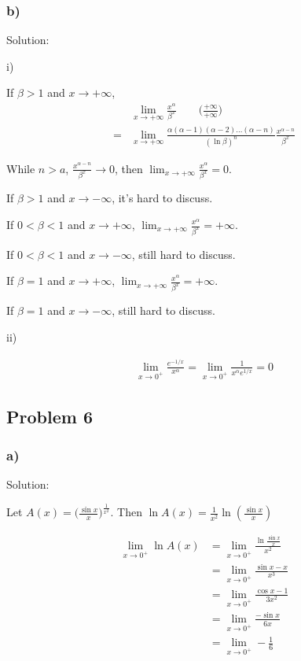 \documentclass[letterpaper, 11pt]{article}
\newcommand{\1}{\mathds{1}}	%
\theoremstyle{definition}
\begin{document}
  \subsubsection*{b)}

  Solution:

  i)

  If $\beta > 1$ and $ x \to +\infty$,
  \begin{align*}
      & \lim_{x \to +\infty} \frac{x ^{\alpha}}{\beta ^{x}} \qquad\text{($\frac{+\infty}{+\infty}$)}                             \\
    = & \lim_{x \to +\infty}\frac{\alpha(\alpha-1)(\alpha-2)\dots(\alpha-n)}{(\ln \beta)^{n}} \frac{x ^{\alpha - n}}{\beta ^{x}}
  \end{align*}

  While $n > a$, $\frac{x ^{\alpha - n}}{\beta ^{x}} \to 0$, then $\lim_{x \to +\infty} \frac{x ^{\alpha}}{\beta ^{x}} = 0$.

  If $\beta > 1$ and $ x \to -\infty$, it's hard to discuss.

  If $0 < \beta < 1$ and $ x \to +\infty$, $\lim_{x \to +\infty} \frac{x ^{\alpha}}{\beta ^{x}} = +\infty$.

  If $0 < \beta < 1$ and $ x \to -\infty$, still hard to discuss.

  If $\beta = 1$ and $x \to +\infty $, $\lim_{x \to +\infty} \frac{x ^{\alpha}}{\beta ^{x}} = +\infty$.

  If $\beta = 1$ and $x \to -\infty $, still hard to discuss.

  ii)

  \begin{align*}
    \lim_{x \to 0 ^{+}} \frac{e ^{-1/x}}{x ^{\alpha}} = \lim_{x \to 0 ^{+}} \frac{1}{x ^{\alpha}e ^{1/x}} = 0
  \end{align*}


  \subsection*{Problem 6}

  \subsubsection*{a)}

  Solution:

  Let $A(x) = \big( \frac{\sin x}{x}\big)^{\frac{1}{x ^{2}}}$. Then $\ln A(x)  = \frac{1}{x ^{2}}\ln(\frac{\sin x}{x})$

  \begin{align*}
    \lim_{x \to 0 ^{+}} \ln A(x) & = \lim_{x \to 0 ^{+}}  \frac{\ln \frac{\sin x}{x}}{x ^{2}} \\
                                 & = \lim_{x \to 0 ^{+}} \frac{\sin x - x}{x ^{3}}            \\
                                 & =\lim_{x \to 0 ^{+}}  \frac{\cos x - 1}{3 x ^{2}}          \\
                                 & = \lim_{x \to 0 ^{+}} \frac{-\sin x}{6x}                   \\
                                 & = \lim_{x \to 0 ^{+}} -\frac{1}{6}
  \end{align*}
\end{document}
